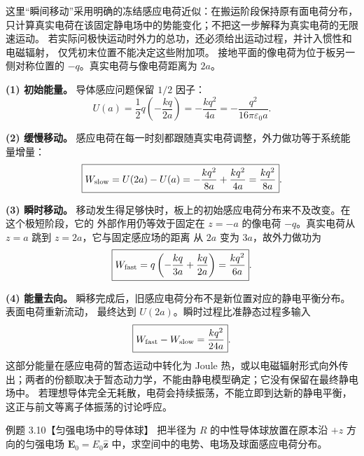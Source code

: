 \begin{xesolution}
这里“瞬间移动”采用明确的冻结感应电荷近似：在搬运阶段保持原有面电荷分布，
只计算真实电荷在该固定静电场中的势能变化；不把这一步解释为真实电荷的无限速运动。
若实际问极快运动时外力的总功，还必须给出运动过程，并计入惯性和电磁辐射，
仅凭初末位置不能决定这些附加项。
接地平面的像电荷为位于板另一侧对称位置的 $-q$。真实电荷与像电荷距离为 $2a$。

\planeEnergyFigure

\textbf{(1) 初始能量。} 导体感应问题保留 $1/2$ 因子：
\[
  \boxed{U(a)=\frac12q\left(-\frac{kq}{2a}\right)
  =-\frac{kq^2}{4a}=-\frac{q^2}{16\pi\varepsilon_0a}}.
\]

\textbf{(2) 缓慢移动。} 感应电荷在每一时刻都跟随真实电荷调整，外力做功等于系统能量增量：
\[
  \boxed{W_{\rm slow}=U(2a)-U(a)
  =-\frac{kq^2}{8a}+\frac{kq^2}{4a}
  =\frac{kq^2}{8a}}.
\]

\textbf{(3) 瞬时移动。} 移动发生得足够快时，板上的初始感应电荷分布来不及改变。在这个极短阶段，它的
外部作用仍等效于固定在 $z=-a$ 的像电荷 $-q$。真实电荷从 $z=a$ 跳到 $z=2a$，它与固定感应场的距离
从 $2a$ 变为 $3a$，故外力做功为
\[
  \boxed{W_{\rm fast}=q\left(-\frac{kq}{3a}+\frac{kq}{2a}\right)
  =\frac{kq^2}{6a}}.
\]

\textbf{(4) 能量去向。} 瞬移完成后，旧感应电荷分布不是新位置对应的静电平衡分布。表面电荷重新流动，
最终达到 $U(2a)$。瞬时过程比准静态过程多输入
\[
  \boxed{W_{\rm fast}-W_{\rm slow}=\frac{kq^2}{24a}}.
\]
这部分能量在感应电荷的暂态运动中转化为 Joule 热，或以电磁辐射形式向外传出；两者的份额取决于暂态动力学，不能由静电模型确定；它没有保留在最终静电场中。
若理想导体完全无耗散，电荷会持续振荡，不能立即到达新的静电平衡，这正与前文等离子体振荡的讨论呼应。
\end{xesolution}

\begin{origexamplebox}{例题 3.10【匀强电场中的导体球】}
把半径为 $R$ 的中性导体球放置在原本沿 $+z$ 方向的匀强电场
$\boldsymbol E_0=E_0\hat{\boldsymbol z}$ 中，求空间中的电势、电场及球面感应电荷分布。
\end{origexamplebox}

